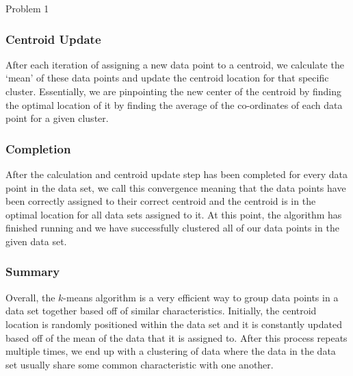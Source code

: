 \begin{problem}{Problem 1}
\begin{Highlight}[Solution]
        \subsubsection*{Centroid Update}

        After each iteration of assigning a new data point to a centroid, we calculate the `mean' of these data points and update the centroid location for that specific cluster. Essentially, we are pinpointing
        the new center of the centroid by finding the optimal location of it by finding the average of the co-ordinates of each data point for a given cluster. \vspace*{1em}

        \subsubsection*{Completion}

        After the calculation and centroid update step has been completed for every data point in the data set, we call this convergence meaning that the data points have been correctly assigned to their
        correct centroid and the centroid is in the optimal location for all data sets assigned to it. At this point, the algorithm has finished running and we have successfully clustered all of our data points
        in the given data set. \vspace*{1em}

        \subsubsection*{Summary}

        Overall, the $k$-means algorithm is a very efficient way to group data points in a data set together based off of similar characteristics. Initially, the centroid location is randomly positioned within
        the data set and it is constantly updated based off of the mean of the data that it is assigned to. After this process repeats multiple times, we end up with a clustering of data where the data in the data
        set usually share some common characteristic with one another.
    \end{Highlight}
\end{problem}

